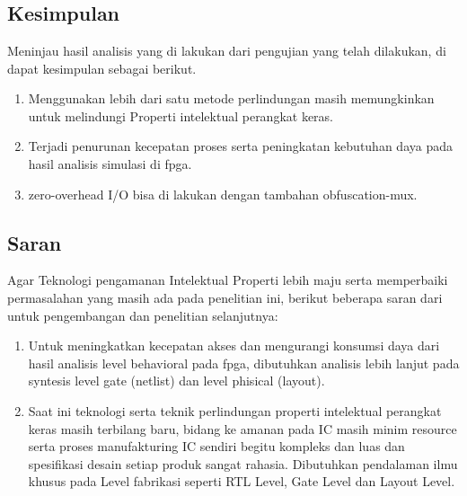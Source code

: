 \chapter{\kesimpulan}

\section{Kesimpulan}
Meninjau hasil analisis yang di lakukan dari pengujian yang telah dilakukan, di dapat kesimpulan sebagai berikut.

\begin{enumerate}	
	\item Menggunakan lebih dari satu metode perlindungan masih memungkinkan untuk melindungi Properti intelektual perangkat keras.
	
	\item Terjadi penurunan kecepatan proses serta peningkatan kebutuhan daya pada hasil analisis simulasi di fpga.
	
	\item zero-overhead I/O bisa di lakukan dengan tambahan obfuscation-mux.
\end{enumerate}

\section{Saran}
Agar Teknologi pengamanan Intelektual Properti lebih maju serta memperbaiki permasalahan yang masih ada pada penelitian ini, berikut beberapa saran dari untuk pengembangan dan penelitian selanjutnya:

\begin{enumerate}
	\item Untuk meningkatkan kecepatan akses dan mengurangi konsumsi daya dari hasil analisis level behavioral pada fpga, dibutuhkan analisis lebih lanjut pada syntesis level gate (netlist) dan level phisical (layout).
	
	\item Saat ini teknologi serta teknik perlindungan properti intelektual perangkat keras masih terbilang baru, bidang ke amanan pada IC masih minim resource serta proses manufakturing IC sendiri begitu kompleks dan luas dan spesifikasi desain setiap produk sangat rahasia. Dibutuhkan pendalaman ilmu khusus pada Level fabrikasi seperti RTL Level, Gate Level dan Layout Level.
\end{enumerate}
